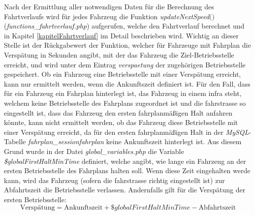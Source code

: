 Nach der Ermittlung aller notwendigen Daten für die Berechnung des Fahrtverlaufs wird für jedes Fahrzeug die Funktion \textit{updateNextSpeed$($$)$} (\textit{functions\_fahrtverlauf.php}) aufgerufen, welche den Fahrtverlauf berechnet und in Kapitel \ref{kapitelFahrtverlauf} im Detail beschrieben wird. Wichtig an dieser Stelle ist der Rückgabewert der Funktion, welcher für Fahrzeuge mit Fahrplan die Verspätung in Sekunden angibt, mit der das Fahrzeug die Ziel-Betriebsstelle erreicht, und wird unter dem Eintrag \textit{verspaetung} der zugehörigen Betriebsstelle gespeichert. Ob ein Fahrzeug eine Betriebsstelle mit einer Verspätung erreicht, kann nur ermittelt werden, wenn die Ankunftszeit definiert ist. Für den Fall, dass für ein Fahrzeug ein Fahrplan hinterlegt ist, das Fahrzeug in einem \ac{infra} steht, welchem keine Betriebsstelle des Fahrplans zugeordnet ist und die \Gls{fahrstrasse} so eingestellt ist, dass das Fahrzeug den ersten fahrplanmäßigen Halt anfahren könnte, kann nicht ermittelt werden, ob das Fahrzeug diese Betriebsstelle mit einer Verspätung erreicht, da für den ersten fahrplanmäßigen Halt in der \textit{MySQL}-Tabelle \textit{fahrplan\_sessionfahrplan} keine Ankunftszeit hinterlegt ist. Aus diesem Grund wurde in der Datei \textit{global\_variables.php} die Variable \textit{\$globalFirstHaltMinTime} definiert, welche angibt, wie lange ein Fahrzeug an der ersten Betriebsstelle des Fahrplans halten soll. Wenn diese Zeit eingehalten werde kann, wird das Fahrzeug (sofern die \Gls{fahrstrasse} richtig eingestellt ist) zur Abfahrtszeit die Betriebsstelle verlassen. Andernfalls gilt für die Verspätung der ersten Betriebsstelle:
\begin{equation*}
\textrm{Verspätung} = \textrm{Ankunftszeit} + \textit{\$globalFirstHaltMinTime} - \textrm{Abfahrtszeit}
\end{equation*}
